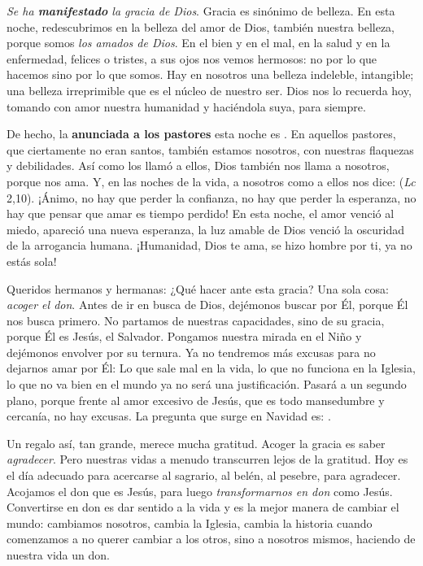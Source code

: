 \begin{body}
	\emph{Se ha \textbf{manifestado} la gracia de Dios}. Gracia es sinónimo de belleza. En esta noche, redescubrimos en la belleza del amor de Dios, también nuestra belleza, porque somos \emph{los amados de Dios}. En el bien y en el mal, en la salud y en la enfermedad, felices o tristes, a sus ojos nos vemos hermosos: no por lo que hacemos sino por lo que somos. Hay en nosotros una belleza indeleble, intangible; una belleza irreprimible que es el núcleo de nuestro ser. Dios nos lo recuerda hoy, tomando con amor nuestra humanidad y haciéndola suya,  para siempre.
	
	De hecho, la \textbf{ anunciada a los pastores} esta noche es . En aquellos pastores, que ciertamente no eran santos, también estamos nosotros, con nuestras flaquezas y debilidades. Así como los llamó a ellos, Dios también nos llama a nosotros, porque nos ama. Y, en las noches de la vida, a nosotros como a ellos nos dice:  (\emph{Lc} 2,10). ¡Ánimo, no hay que perder la confianza, no hay que perder la esperanza, no hay que pensar que amar es tiempo perdido! En esta noche, el amor venció al miedo, apareció una nueva esperanza, la luz amable de Dios venció la oscuridad de la arrogancia humana. ¡Humanidad, Dios te ama, se hizo hombre por ti, ya no estás sola!
	
	Queridos hermanos y hermanas: ¿Qué hacer ante esta gracia? Una sola cosa: \emph{acoger el don}. Antes de ir en busca de Dios, dejémonos buscar por Él, porque Él nos busca primero. No partamos de nuestras capacidades, sino de su gracia, porque Él es Jesús, el Salvador. Pongamos nuestra mirada en el Niño y dejémonos envolver por su ternura. Ya no tendremos más excusas para no dejarnos amar por Él: Lo que sale mal en la vida, lo que no funciona en la Iglesia, lo que no va bien en el mundo ya no será una justificación. Pasará a un segundo plano, porque frente al amor excesivo de Jesús, que es todo mansedumbre y cercanía, no hay excusas. La pregunta que surge en Navidad es: .
	
	Un regalo así, tan grande, merece mucha gratitud. Acoger la gracia es saber \emph{agradecer}. Pero nuestras vidas a menudo transcurren lejos de la gratitud. Hoy es el día adecuado para acercarse al sagrario, al belén, al pesebre, para agradecer. Acojamos el don que es Jesús, para luego \emph{transformarnos en don} como Jesús. Convertirse en don es dar sentido a la vida y es la mejor manera de cambiar el mundo: cambiamos nosotros, cambia la Iglesia, cambia la historia cuando comenzamos a no querer cambiar a los otros, sino a nosotros mismos, haciendo de nuestra vida un don.
	

\end{body}
